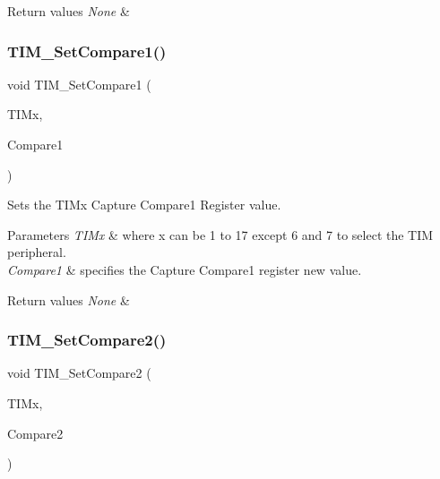 \begin{DoxyRetVals}{Return values}
{\em None} & \\
\hline
\end{DoxyRetVals}
\mbox{\label{group___t_i_m___private___functions_gab3a6031f187cb8af62eb09a67b4fd2ad}} 
\subsubsection{\texorpdfstring{TIM\_SetCompare1()}{TIM\_SetCompare1()}}
{\footnotesize\ttfamily void T\+I\+M\+\_\+\+Set\+Compare1 (\begin{DoxyParamCaption}\item[{\mbox{\hyperlink{struct_t_i_m___type_def}{T\+I\+M\+\_\+\+Type\+Def}} $\ast$}]{T\+I\+Mx,  }\item[{uint16\+\_\+t}]{Compare1 }\end{DoxyParamCaption})}



Sets the T\+I\+Mx Capture Compare1 Register value. 


\begin{DoxyParams}{Parameters}
{\em T\+I\+Mx} & where x can be 1 to 17 except 6 and 7 to select the T\+IM peripheral. \\
\hline
{\em Compare1} & specifies the Capture Compare1 register new value. \\
\hline
\end{DoxyParams}

\begin{DoxyRetVals}{Return values}
{\em None} & \\
\hline
\end{DoxyRetVals}
\mbox{\label{group___t_i_m___private___functions_ga0175ef4fabade443909002a63d4e9758}} 
\subsubsection{\texorpdfstring{TIM\_SetCompare2()}{TIM\_SetCompare2()}}
{\footnotesize\ttfamily void T\+I\+M\+\_\+\+Set\+Compare2 (\begin{DoxyParamCaption}\item[{\mbox{\hyperlink{struct_t_i_m___type_def}{T\+I\+M\+\_\+\+Type\+Def}} $\ast$}]{T\+I\+Mx,  }\item[{uint16\+\_\+t}]{Compare2 }\end{DoxyParamCaption})}



